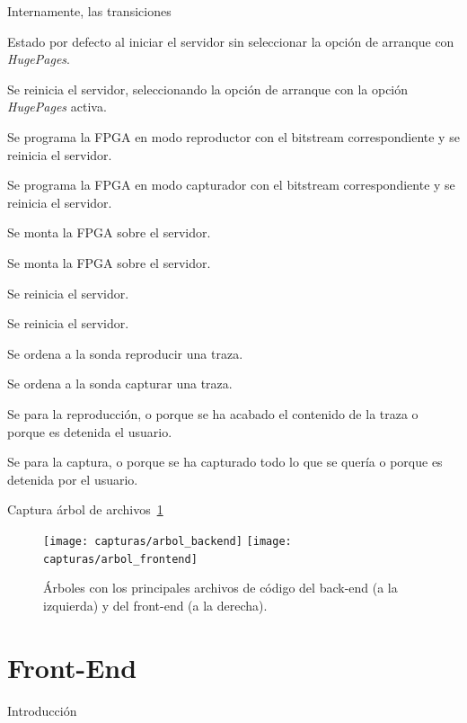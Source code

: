 Internamente, las transiciones
\begin{enumerate}[label={\bfseries [\arabic*]}]
  \item Estado por defecto al iniciar el servidor sin seleccionar la opción de arranque con \textit{HugePages}.
  \item Se reinicia el servidor, seleccionando la opción de arranque con la opción \textit{HugePages} activa.
  \item Se programa la \gls{FPGA} en modo reproductor con el \gls{bitstream} correspondiente y se reinicia el servidor.
  \item Se programa la \gls{FPGA} en modo capturador con el \gls{bitstream} correspondiente y se reinicia el servidor.
  \item Se monta la \gls{FPGA} sobre el servidor.
  \item Se monta la \gls{FPGA} sobre el servidor.
  \item Se reinicia el servidor.
  \item Se reinicia el servidor.
  \item Se ordena a la sonda reproducir una \gls{traza}.
  \item Se ordena a la sonda capturar una \gls{traza}.
  \item Se para la reproducción, o porque se ha acabado el contenido de la \gls{traza} o porque es detenida el usuario.
  \item Se para la captura, o porque se ha capturado todo lo que se quería o porque es detenida por el usuario.
\end{enumerate}


Captura árbol de archivos~\ref{fig:arbol_codigo}

\begin{figure}[!htp]
  \begin{center}
    \texttt{[image: capturas/arbol\_backend]}
    \hspace{1cm}
    \texttt{[image: capturas/arbol\_frontend]}
  \caption{Árboles con los principales archivos de código del \gls{back-end} (a la izquierda) y del \gls{front-end} (a la derecha).}
  \label{fig:arbol_codigo}
  \end{center}
\end{figure}


\section{Front-End\label{sec:imp:front_end}}

Introducción

